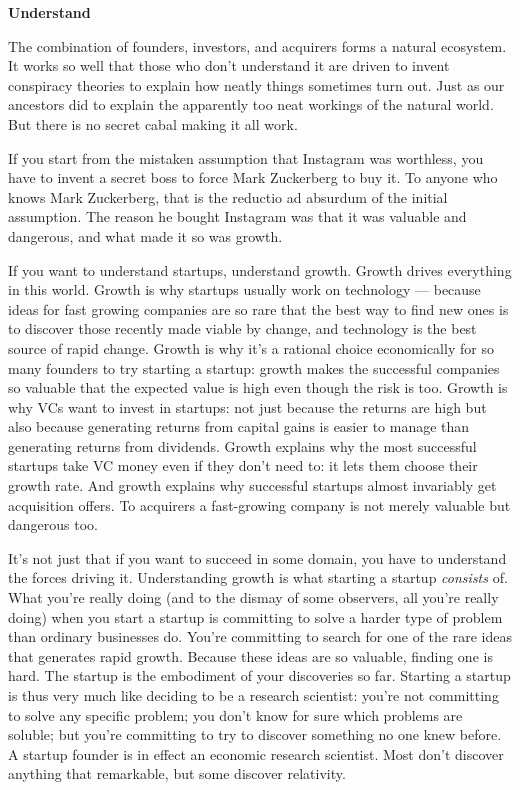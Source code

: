 \documentclass[12pt]{book}
\begin{document}
\textbf{Understand}

The combination of founders, investors, and acquirers forms a natural
ecosystem. It works so well that those who don't understand it are
driven to invent conspiracy theories to explain how neatly things
sometimes turn out. Just as our ancestors did to explain the apparently
too neat workings of the natural world. But there is no secret cabal
making it all work.

If you start from the mistaken assumption that Instagram was worthless,
you have to invent a secret boss to force Mark Zuckerberg to buy it. To
anyone who knows Mark Zuckerberg, that is the reductio ad absurdum of
the initial assumption. The reason he bought Instagram was that it was
valuable and dangerous, and what made it so was growth.

If you want to understand startups, understand growth. Growth drives
everything in this world. Growth is why startups usually work on
technology --- because ideas for fast growing companies are so rare that
the best way to find new ones is to discover those recently made viable
by change, and technology is the best source of rapid change. Growth is
why it's a rational choice economically for so many founders to try
starting a startup: growth makes the successful companies so valuable
that the expected value is high even though the risk is too. Growth is
why VCs want to invest in startups: not just because the returns are
high but also because generating returns from capital gains is easier to
manage than generating returns from dividends. Growth explains why the
most successful startups take VC money even if they don't need to: it
lets them choose their growth rate. And growth explains why successful
startups almost invariably get acquisition offers. To acquirers a
fast-growing company is not merely valuable but dangerous too.

It's not just that if you want to succeed in some domain, you have to
understand the forces driving it. Understanding growth is what starting
a startup \emph{consists} of. What you're really doing (and to the
dismay of some observers, all you're really doing) when you start a
startup is committing to solve a harder type of problem than ordinary
businesses do. You're committing to search for one of the rare ideas
that generates rapid growth. Because these ideas are so valuable,
finding one is hard. The startup is the embodiment of your discoveries
so far. Starting a startup is thus very much like deciding to be a
research scientist: you're not committing to solve any specific problem;
you don't know for sure which problems are soluble; but you're
committing to try to discover something no one knew before. A startup
founder is in effect an economic research scientist. Most don't discover
anything that remarkable, but some discover relativity.
\end{document}
